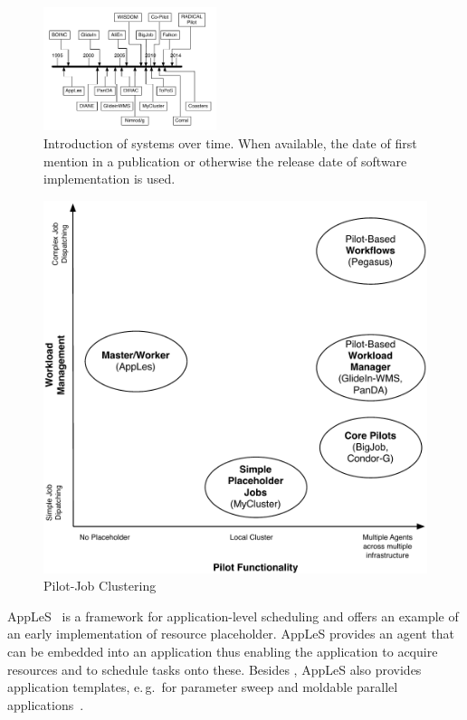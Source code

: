\documentclass{sig-alternate}
\begin{document}

\begin{figure}[t]
  \centering
    \includegraphics[width=0.45\textwidth]{figures/timeline}
    \caption{Introduction of systems over time. When available, the date of
    first mention in a publication or otherwise the release date of software
    implementation is used. }
    \label{fig:timeline}
\end{figure}

\begin{figure}[t]
  \centering
    \includegraphics[width=.45\textwidth]{figures/pilotjob-clustering.pdf}
  \caption{Pilot-Job Clustering}
  \label{fig:pilotjob_clustering}
\end{figure}

AppLeS~\cite{Berman:1996:apples} is a framework for application-level scheduling
and offers an example of an early implementation of resource placeholder. AppLeS
provides an agent that can be embedded into an application thus enabling the
application to acquire resources and to schedule tasks onto these. Besides \MW,
AppLeS also provides application templates, e.\,g.\ for parameter sweep and
moldable parallel applications~\cite{Berman:2003:ACG:766629.766632}.
\end{document}
